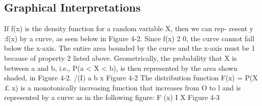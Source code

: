
\subsection*{Graphical Interpretations}
If f(x) is the density function for a random variable X, then we can rep-
resent y :f(x) by a curve, as seen below in Figure 4-2. Since f(x) 2 0,
the curve cannot fall below the x-axis. The entire area bounded by the
curve and the x-axis must be 1 because of property 2 listed above.
Geometrically, the probability that X is between a and b, i.e.,
P(a < X < b), is then represented by the area shown shaded, in Figure
4-2.
/(I)
a b x
Figure 4-2
The distribution function F(x) = P(X £ x) is a monotonically
increasing function that increases from O to l and is represented by a
curve as in the following ﬁgure:
F (x)
I
X
Figure 4-3


